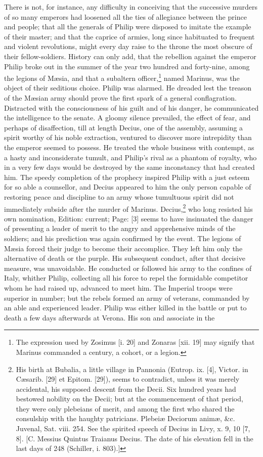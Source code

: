There is not, for instance, any difficulty in conceiving that the successive murders of so many emperors had loosened all the ties of allegiance between the prince and people; that all the generals of Philip were disposed to imitate the example of their master; and that the caprice of armies, long since habituated to frequent and violent revolutions, might every day raise to the throne the most obscure of their fellow-soldiers. History can only add, that the rebellion against the emperor Philip broke out in the summer of the year two hundred and forty-nine, among the legions of Mæsia, and that a subaltern officer,\footnote{The expression used by Zosimus [i. 20] and Zonaras [xii. 19] may signify that Marinus commanded a century, a cohort, or a legion.} named Marinus, was the object of their seditious choice. Philip was alarmed. He dreaded lest the treason of the Mæsian army should prove the first spark of a general conflagration. Distracted with the consciousness of his guilt and of his danger, he communicated the intelligence to the senate. A gloomy silence prevailed, the effect of fear, and perhaps of disaffection, till at length Decius, one of the assembly, assuming a spirit worthy of his noble extraction, ventured to discover more intrepidity than the emperor seemed to possess. He treated the whole business with contempt, as a hasty and inconsiderate tumult, and Philip\texthebrew{}’s rival as a phantom of royalty, who in a very few days would be destroyed by the same inconstancy that had created him. The speedy completion of the prophecy inspired Philip with a just esteem for so able a counsellor, and Decius appeared to him the only person capable of restoring peace and discipline to an army whose tumultuous spirit did not immediately subside after the murder of Marinus. Decius,\footnote{His birth at Bubalia, a little village in Pannonia (Eutrop. ix. [4], Victor. in Cæsarib. [29] et Epitom. [29]), seems to contradict, unless it was merely accidental, his supposed descent from the Decii. Six hundred years had bestowed nobility on the Decii; but at the commencement of that period, they were only plebeians of merit, and among the first who shared the consulship with the haughty patricians. Plebeiæ Deciorum animæ, \&c. Juvenal, Sat. viii. 254. See the spirited speech of Decius in Livy, x. 9, 10 [7, 8]. [C. Messius Quintus Traianus Decius. The date of his elevation fell in the last days of 248 (Schiller, i. 803).]} who long resisted his own nomination, Edition: current; Page: [3] seems to have insinuated the danger of presenting a leader of merit to the angry and apprehensive minds of the soldiers; and his prediction was again confirmed by the event. The legions of Mæsia forced their judge to become their accomplice. They left him only the alternative of death or the purple. His subsequent conduct, after that decisive measure, was unavoidable. He conducted or followed his army to the confines of Italy, whither Philip, collecting all his force to repel the formidable competitor whom he had raised up, advanced to meet him. The Imperial troops were superior in number; but the rebels formed an army of veterans, commanded by an able and experienced leader. Philip was either killed in the battle or put to death a few days afterwards at Verona. His son and associate in the 